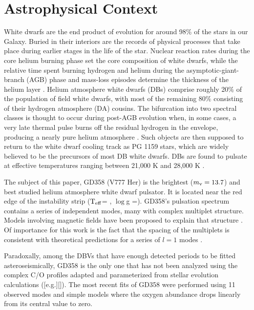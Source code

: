 \documentclass[12pt,preprint]{aastex}
\newcommand{\teff}{$\rm T_{eff}$}
\newcommand{\logg}{$\log$g }
\begin{document}

\section{Astrophysical Context}
White dwarfs are the end product of evolution for around 98\% of the stars in our Galaxy. 
Buried in their interiors are the records of physical processes that take place during 
earlier stages in the life of the star. Nuclear reaction rates during the core helium 
burning phase set the core composition of white dwarfs, while the relative time spent 
burning hydrogen and helium during the asymptotic-giant-branch (AGB) phase and mass-loss 
episodes determine the thickness of the helium layer \citep{Lawlor06,Althaus05}. Helium 
atmosphere white dwarfs (DBs) comprise roughly 20\% of the population of field white 
dwarfs, with most of the remaining 80\% consisting of their hydrogen atmosphere (DA) 
cousins. The bifurcation into two spectral classes is thought to occur during post-AGB 
evolution when, in some cases, a very late thermal pulse burns off the residual hydrogen 
in the envelope, producing a nearly pure helium atmosphere \citep{Iben83}. Such objects 
are then supposed to return to the white dwarf cooling track as PG 1159 stars, which are 
widely believed to be the precursors of most DB white dwarfs. DBs are found to pulsate at 
effective temperatures ranging between 21,000 K and 28,000 K \citep{Beauchamp99, Castanheira05}. 

The subject of this paper, GD358 (V777 Her) is the brightest ($m_{\rm v}=13.7$) and best 
studied helium atmosphere white dwarf pulsator. It is located near the red edge of the 
instability strip (\teff = , \logg =). GD358's pulsation spectrum contains a series of 
independent modes, many with complex multiplet structure.  Models involving magnetic 
fields have been proposed to explain that structure \citep{Montgomery10}. Of importance for
this work is the fact that the spacing of the multiplets is consistent with theoretical 
predictions for a series of $l=1$ modes \citep{Provencal09}.

Paradoxally, among the DBVs that have enough detected periods to be fitted 
asteroseismically, GD358 is the only one that has not been analyzed using the complex 
C/O profiles adapted and parameterized from stellar evolution calculations
([e.g.][]\citet{Salaris97,Althaus05}). The most recent fits of GD358 \citep{Metcalfe03c} were 
performed using 11 observed modes and simple models where the oxygen abundance 
drops linearly from its central value to zero. 
\end{document}
